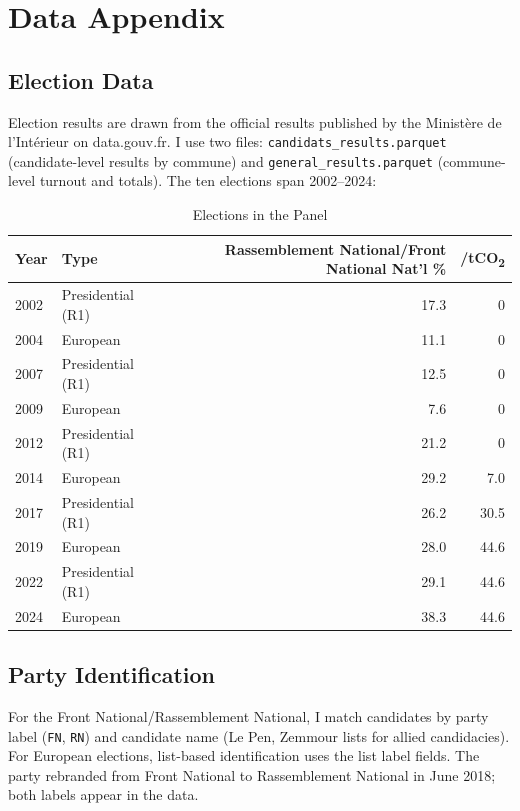 \documentclass[12pt]{article}
\providecommand{\euro}{\texteuro}
\newcommand{\rn}{Rassemblement National}
\newcommand{\fn}{Front National}
\begin{document}
\clearpage
\appendix
\setcounter{table}{0}
\renewcommand{\thetable}{A\arabic{table}}
\setcounter{figure}{0}
\renewcommand{\thefigure}{A\arabic{figure}}

\section{Data Appendix}
\label{app:data}

\subsection{Election Data}

Election results are drawn from the official results published by the Minist\`{e}re de l'Int\'{e}rieur on data.gouv.fr. I use two files: \texttt{candidats\_results.parquet} (candidate-level results by commune) and \texttt{general\_results.parquet} (commune-level turnout and totals). The ten elections span 2002--2024:

\begin{table}[H]
\centering
\caption{Elections in the Panel}
\label{tab:elections}
\small
\begin{tabular}{@{}llrr@{}}
\toprule
Year & Type & \rn{}/\fn{} Nat'l \% & \euro/tCO\textsubscript{2} \\
\midrule
2002 & Presidential (R1) & 17.3 & 0 \\
2004 & European & 11.1 & 0 \\
2007 & Presidential (R1) & 12.5 & 0 \\
2009 & European & 7.6 & 0 \\
2012 & Presidential (R1) & 21.2 & 0 \\
2014 & European & 29.2 & 7.0 \\
2017 & Presidential (R1) & 26.2 & 30.5 \\
2019 & European & 28.0 & 44.6 \\
2022 & Presidential (R1) & 29.1 & 44.6 \\
2024 & European & 38.3 & 44.6 \\
\bottomrule
\end{tabular}
\end{table}

\subsection{Party Identification}

For the \fn{}/\rn{}, I match candidates by party label (\texttt{FN}, \texttt{RN}) and candidate name (Le Pen, Zemmour lists for allied candidacies). For European elections, list-based identification uses the list label fields. The party rebranded from \fn{} to \rn{} in June 2018; both labels appear in the data.
\end{document}
